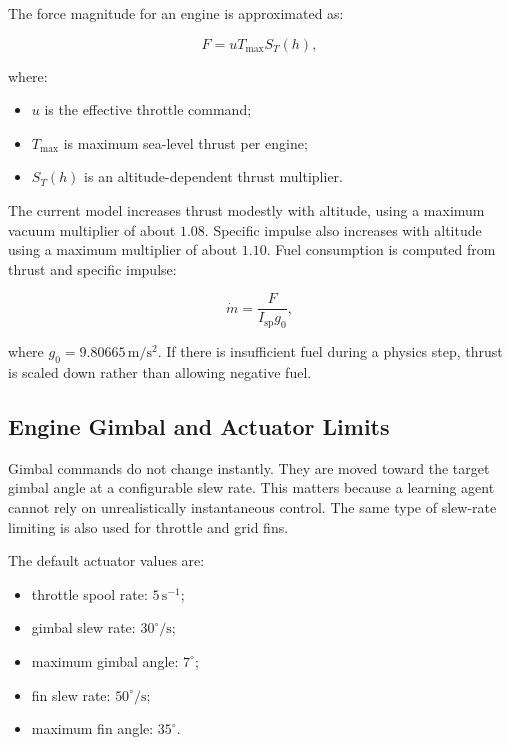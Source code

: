 \documentclass[12pt,a4paper]{article}
\begin{document}
The force magnitude for an engine is approximated as:

\begin{equation}
F = u T_{\max} S_T(h),
\end{equation}

where:

\begin{itemize}
    \item \(u\) is the effective throttle command;
    \item \(T_{\max}\) is maximum sea-level thrust per engine;
    \item \(S_T(h)\) is an altitude-dependent thrust multiplier.
\end{itemize}

The current model increases thrust modestly with altitude, using a maximum vacuum multiplier of about \(1.08\). Specific impulse also increases with altitude using a maximum multiplier of about \(1.10\). Fuel consumption is computed from thrust and specific impulse:

\begin{equation}
\dot{m} = \frac{F}{I_{\mathrm{sp}} g_0},
\end{equation}

where \(g_0 = 9.80665\,\mathrm{m/s^2}\). If there is insufficient fuel during a physics step, thrust is scaled down rather than allowing negative fuel.

\subsection{Engine Gimbal and Actuator Limits}

Gimbal commands do not change instantly. They are moved toward the target gimbal angle at a configurable slew rate. This matters because a learning agent cannot rely on unrealistically instantaneous control. The same type of slew-rate limiting is also used for throttle and grid fins.

The default actuator values are:

\begin{itemize}
    \item throttle spool rate: \(5\,\mathrm{s^{-1}}\);
    \item gimbal slew rate: \(30^\circ/\mathrm{s}\);
    \item maximum gimbal angle: \(7^\circ\);
    \item fin slew rate: \(50^\circ/\mathrm{s}\);
    \item maximum fin angle: \(35^\circ\).
\end{itemize}
\end{document}

